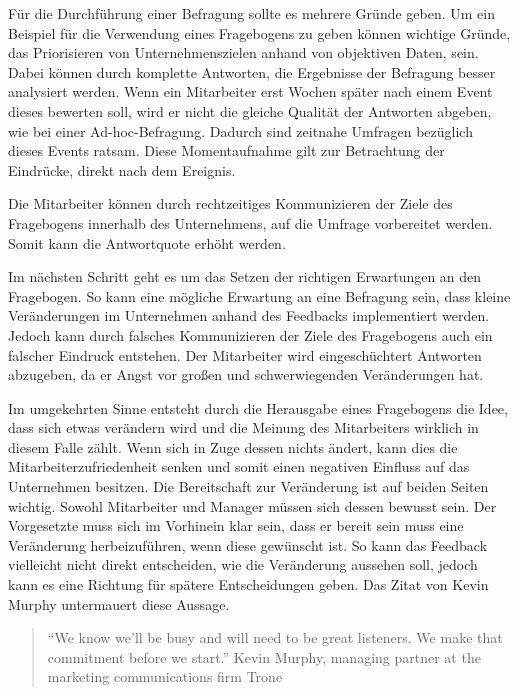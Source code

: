 Für die Durchführung einer Befragung sollte es mehrere Gründe geben. 
Um ein Beispiel für die Verwendung eines Fragebogens zu geben können wichtige Gründe, das Priorisieren von Unternehmenszielen anhand von objektiven Daten, sein. 
Dabei können durch komplette Antworten, die Ergebnisse der Befragung besser analysiert werden. 
Wenn ein Mitarbeiter erst Wochen später nach einem Event dieses bewerten soll, wird er nicht die gleiche Qualität der Antworten abgeben, wie bei einer Ad-hoc-Befragung.
Dadurch sind zeitnahe Umfragen bezüglich dieses Events ratsam. 
Diese Momentaufnahme gilt zur Betrachtung der Eindrücke, direkt nach dem Ereignis.

Die Mitarbeiter können durch rechtzeitiges Kommunizieren der Ziele des Fragebogens innerhalb des Unternehmens, auf die Umfrage vorbereitet werden. 
Somit kann die Antwortquote erhöht werden. 

Im nächsten Schritt geht es um das Setzen der richtigen Erwartungen an den Fragebogen. 
So kann eine mögliche Erwartung an eine Befragung sein, dass kleine Veränderungen im Unternehmen anhand des Feedbacks implementiert werden. 
Jedoch kann durch falsches Kommunizieren der Ziele des Fragebogens auch ein falscher Eindruck entstehen.
Der Mitarbeiter wird eingeschüchtert Antworten abzugeben, da er Angst vor großen und schwerwiegenden Veränderungen hat\autocite[Chapter 3
Setting Expectations]{Perfect}.

Im umgekehrten Sinne entsteht durch die Herausgabe eines Fragebogens die Idee, dass sich etwas verändern wird und die Meinung des Mitarbeiters wirklich in diesem Falle zählt.
Wenn sich in Zuge dessen nichts ändert, kann dies die Mitarbeiterzufriedenheit senken und somit einen negativen Einfluss auf das Unternehmen besitzen.
Die Bereitschaft zur Veränderung ist auf beiden Seiten wichtig. 
Sowohl Mitarbeiter und Manager müssen sich dessen bewusst sein.
Der Vorgesetzte muss sich im Vorhinein klar sein, dass er bereit sein muss eine Veränderung herbeizuführen, wenn diese gewünscht ist.
So kann das Feedback vielleicht nicht direkt entscheiden, wie die Veränderung aussehen soll, jedoch kann es eine Richtung für spätere Entscheidungen geben. 
Das Zitat von Kevin Murphy untermauert diese Aussage\autocite[Chapter 3
Setting Expectations]{Perfect}.
\begin{quote} \enquote{We know we’ll be busy and will need to be great listeners. We make that commitment before we start.} Kevin Murphy, managing partner at the marketing communications firm Trone \end{quote}

